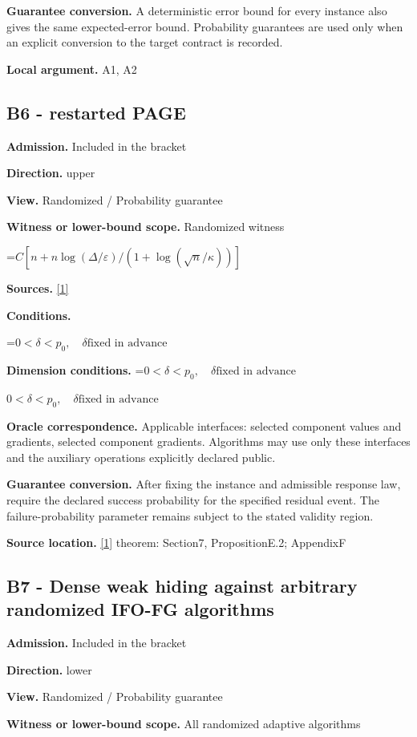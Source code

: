 \documentclass[10pt,a4paper]{article}
\newcommand{\AtlasMath}[1]{\par\begingroup\centering\setbox0=\hbox{$\displaystyle #1$}\ifdim\wd0>1.4\linewidth\typeout{ATLAS WIDE FORMULA: \the\wd0}\fi\ifdim\wd0>\linewidth\resizebox{\linewidth}{!}{\box0}\else\box0\fi\par\endgroup}
\newcommand{\AtlasInlineMath}[1]{\begingroup\setbox0=\hbox{$#1$}\ifdim\wd0>.4\linewidth\endgroup\AtlasMath{#1}\else\endgroup$#1$\fi}
\begin{document}
\textbf{Guarantee conversion.} A deterministic error bound for every instance also gives the same expected-error bound. Probability guarantees are used only when an explicit conversion to the target contract is recorded.

\textbf{Local argument.} A1, A2

\subsection{B6 - restarted PAGE}
\textbf{Admission.} Included in the bracket

\textbf{Direction.} upper

\textbf{View.} Randomized / Probability guarantee

\textbf{Witness or lower-bound scope.} Randomized witness

\AtlasMath{C[n+n\log(\Delta/\varepsilon)/(1+\log(\sqrt n/\kappa))]}
\textbf{Sources.} \href{https://arxiv.org/pdf/2609.00045v3}{[1]}

\textbf{Conditions.} 
\AtlasMath{0<\delta<p_0,\quad\delta\text{fixed in advance}}


\textbf{Dimension conditions.} \AtlasInlineMath{0<\delta<p_0,\quad\delta\text{fixed in advance}}

\textbf{Oracle correspondence.} Applicable interfaces: selected component values and gradients, selected component gradients. Algorithms may use only these interfaces and the auxiliary operations explicitly declared public.

\textbf{Guarantee conversion.} After fixing the instance and admissible response law, require the declared success probability for the specified residual event. The failure-probability parameter remains subject to the stated validity region.

\textbf{Source location.} \href{https://arxiv.org/pdf/2609.00045v3}{[1]} theorem: Section7, PropositionE.2; AppendixF

\subsection{B7 - Dense weak hiding against arbitrary randomized IFO-FG algorithms}
\textbf{Admission.} Included in the bracket

\textbf{Direction.} lower

\textbf{View.} Randomized / Probability guarantee

\textbf{Witness or lower-bound scope.} All randomized adaptive algorithms
\end{document}
